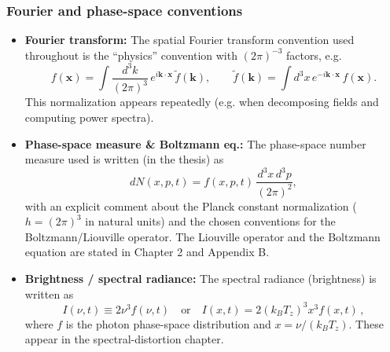 \subsubsection{Fourier and phase-space conventions}
\begin{itemize}
  \item \textbf{Fourier transform:} The spatial Fourier transform convention used throughout is the ``physics'' convention with $(2\pi)^{-3}$ factors, e.g.
  \[ f(\mathbf{x})=\int\frac{d^3k}{(2\pi)^3}\,e^{i\mathbf{k}\cdot\mathbf{x}}\,\tilde f(\mathbf{k}),\qquad
     \tilde f(\mathbf{k})=\int d^3x\,e^{-i\mathbf{k}\cdot\mathbf{x}}\,f(\mathbf{x}).\]
  This normalization appears repeatedly (e.g. when decomposing fields and computing power spectra). 
  \item \textbf{Phase-space measure \& Boltzmann eq.:} The phase-space number measure used is written (in the thesis) as
  \[ dN(x,p,t)=f(x,p,t)\,\frac{d^3x\,d^3p}{(2\pi)^2}, \]
  with an explicit comment about the Planck constant normalization ($h=(2\pi)^3$ in natural units) and the chosen conventions for the Boltzmann/Liouville operator. The Liouville operator and the Boltzmann equation are stated in Chapter 2 and Appendix B. 
  \item \textbf{Brightness / spectral radiance:} The spectral radiance (brightness) is written as
  \[ I(\nu,t)\equiv 2\nu^3 f(\nu,t) \quad\text{or}\quad I(x,t)=2(k_B T_z)^3 x^3 f(x,t)\,, \]
  where $f$ is the photon phase-space distribution and $x=\nu/(k_B T_z)$. These appear in the spectral-distortion chapter. 
\end{itemize}

